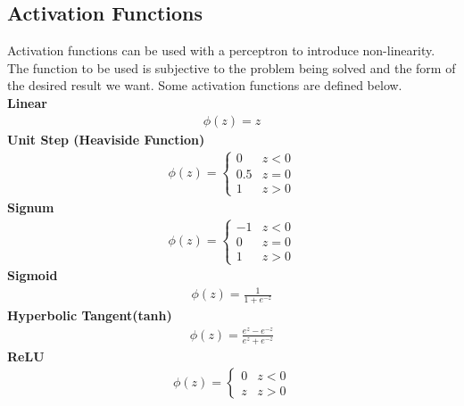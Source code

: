 \subsection{Activation Functions}
Activation functions can be used with a perceptron to introduce non-linearity. The function to be used is subjective to the problem being solved and the form of the desired result we want. Some activation functions are defined below.\\
\textbf{Linear}
\begin{align}
  \phi(z) = z
\end{align}
\textbf{Unit Step (Heaviside Function)}
\begin{align}
  \phi(z) = \begin{cases}
    0 & z<0 \\
    0.5 & z=0 \\
    1 & z>0
  \end{cases}
\end{align}
\textbf{Signum}
\begin{align}
  \phi(z) = \begin{cases}
    -1 & z<0 \\
    0 & z=0 \\
    1 & z>0
  \end{cases}
\end{align}
\textbf{Sigmoid}
\begin{align}
  \phi(z) = \frac{1}{1+ e^{-z}}
\end{align}
\textbf{Hyperbolic Tangent(tanh)}
\begin{align}
  \phi(z) = \frac{e^z - e^{-z}}{e^z + e^{-z}}
\end{align}
\textbf{ReLU}
\begin{align}
  \phi(z) = \begin{cases}
    0 & z<0 \\
    z & z>0
  \end{cases}
\end{align}
